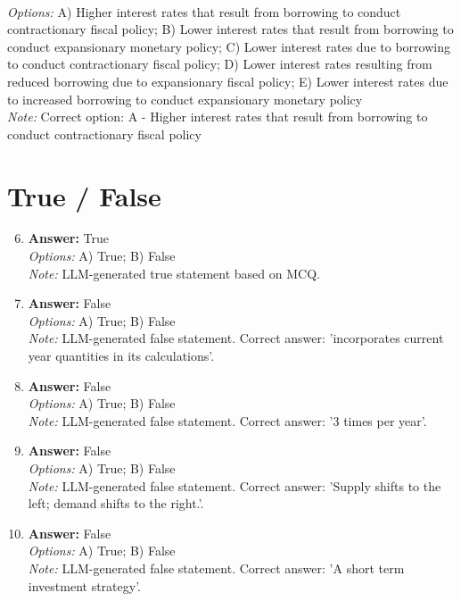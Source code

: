 \documentclass[12pt]{article}
\begin{document}
\begin{enumerate}[label=\arabic*.]
\\ \textit{Options:} A) Higher interest rates that result from borrowing to conduct contractionary fiscal policy; B) Lower interest rates that result from borrowing to conduct expansionary monetary policy; C) Lower interest rates due to borrowing to conduct contractionary fiscal policy; D) Lower interest rates resulting from reduced borrowing due to expansionary fiscal policy; E) Lower interest rates due to increased borrowing to conduct expansionary monetary policy
\\ \textit{Note:} Correct option: A - Higher interest rates that result from borrowing to conduct contractionary fiscal policy
\end{enumerate}

\section*{True / False}
\begin{enumerate}[label=\arabic*.]
\setcounter{enumi}{5}
\item \textbf{Answer:} True
\\ \textit{Options:} A) True; B) False
\\ \textit{Note:} LLM-generated true statement based on MCQ.
\item \textbf{Answer:} False
\\ \textit{Options:} A) True; B) False
\\ \textit{Note:} LLM-generated false statement. Correct answer: 'incorporates current year quantities in its calculations'.
\item \textbf{Answer:} False
\\ \textit{Options:} A) True; B) False
\\ \textit{Note:} LLM-generated false statement. Correct answer: '3 times per year'.
\item \textbf{Answer:} False
\\ \textit{Options:} A) True; B) False
\\ \textit{Note:} LLM-generated false statement. Correct answer: 'Supply shifts to the left; demand shifts to the right.'.
\item \textbf{Answer:} False
\\ \textit{Options:} A) True; B) False
\\ \textit{Note:} LLM-generated false statement. Correct answer: 'A short term investment strategy'.
\end{enumerate}
\end{document}
